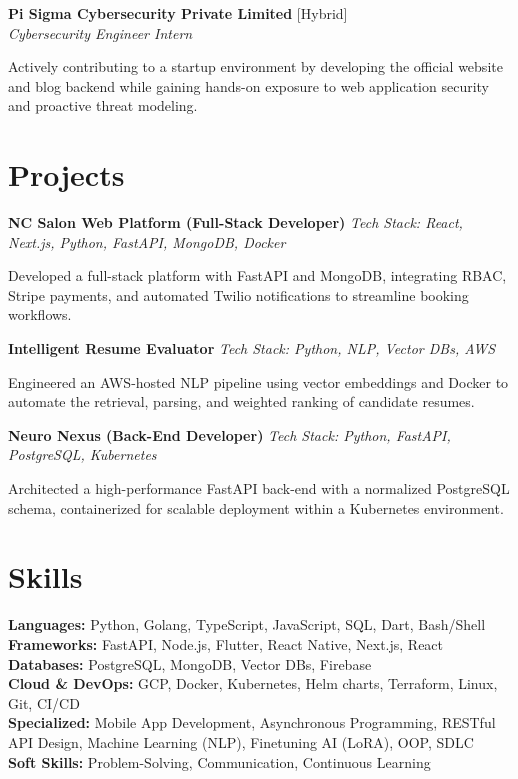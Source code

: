 \documentclass[letterpaper]{article}
\newcommand{\skillitem}[2]{\textbf{#1:} #2}
\begin{document}
\textbf{Pi Sigma Cybersecurity Private Limited} \hfill [Hybrid] \\
\textit{Cybersecurity Engineer Intern} \hfill 
\begin{highlights}
\item Actively contributing to a startup environment by developing the official website and blog backend while gaining hands-on exposure to web application security and proactive threat modeling.
\end{highlights}

\section{Projects}
\textbf{NC Salon Web Platform (Full-Stack Developer)} \hfill \textit{Tech Stack: React, Next.js, Python, FastAPI, MongoDB, Docker}
\begin{highlights}
    \item Developed a full-stack platform with FastAPI and MongoDB, integrating RBAC, Stripe payments, and automated Twilio notifications to streamline booking workflows.
\end{highlights}

\textbf{Intelligent Resume Evaluator} \hfill \textit{Tech Stack: Python, NLP, Vector DBs, AWS}
\begin{highlights}
    \item Engineered an AWS-hosted NLP pipeline using vector embeddings and Docker to automate the retrieval, parsing, and weighted ranking of candidate resumes.
\end{highlights}

\textbf{Neuro Nexus (Back-End Developer)} \hfill \textit{Tech Stack: Python, FastAPI, PostgreSQL, Kubernetes}
\begin{highlights}
    \item Architected a high-performance FastAPI back-end with a normalized PostgreSQL schema, containerized for scalable deployment within a Kubernetes environment.
\end{highlights}

\section{Skills}
\skillitem{Languages}{Python, Golang, TypeScript, JavaScript, SQL, Dart, Bash/Shell}\\[2pt]
\skillitem{Frameworks}{FastAPI, Node.js, Flutter, React Native, Next.js, React}\\[2pt]
\skillitem{Databases}{PostgreSQL, MongoDB, Vector DBs, Firebase}\\[2pt]
\skillitem{Cloud \& DevOps}{GCP, Docker, Kubernetes, Helm charts, Terraform, Linux, Git, CI/CD}\\[2pt]
\skillitem{Specialized}{Mobile App Development, Asynchronous Programming, RESTful API Design, Machine Learning (NLP), Finetuning AI (LoRA), OOP, SDLC}\\[2pt]
\skillitem{Soft Skills}{Problem-Solving, Communication, Continuous Learning}
\end{document}
